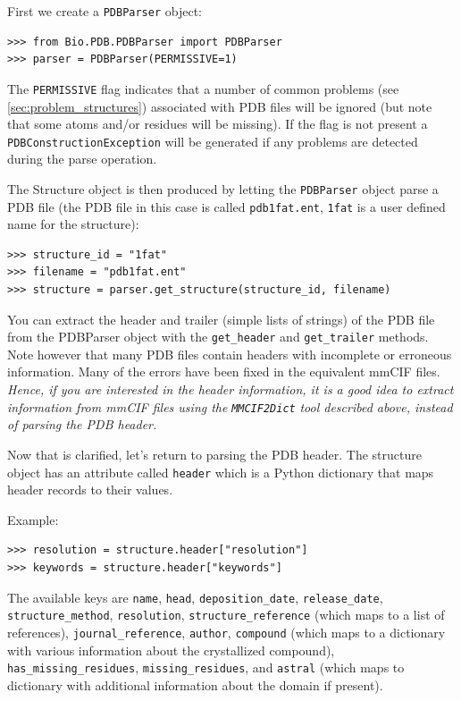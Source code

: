 First we create a \texttt{PDBParser} object:

\begin{verbatim}
>>> from Bio.PDB.PDBParser import PDBParser
>>> parser = PDBParser(PERMISSIVE=1)
\end{verbatim}

The \texttt{PERMISSIVE} flag indicates that a number of common problems (see \ref{sec:problem_structures}) associated with PDB files will be ignored (but note that some atoms and/or residues will be missing). If the flag is not present a \texttt{PDBConstructionException} will be generated if any problems are detected during the parse operation.

The Structure object is then produced by letting the \texttt{PDBParser} object parse a PDB file (the PDB file in this case is called \verb|pdb1fat.ent|, \verb|1fat| is a user defined name for the structure):

\begin{verbatim}
>>> structure_id = "1fat"
>>> filename = "pdb1fat.ent"
>>> structure = parser.get_structure(structure_id, filename)
\end{verbatim}

You can extract the header and trailer (simple lists of strings) of the PDB
file from the PDBParser object with the \texttt{get\_header} and \texttt{get\_trailer}
methods.  Note however that many PDB files contain headers with
incomplete or erroneous information. Many of the errors have been
fixed in the equivalent mmCIF files. \emph{Hence, if you are interested
in the header information, it is a good idea to extract information
from mmCIF files using the} \texttt{\emph{MMCIF2Dict}} \emph{tool
described above, instead of parsing the PDB header. }

Now that is clarified, let's return to parsing the PDB header. The
structure object has an attribute called \texttt{header} which is
a Python dictionary that maps header records to their values.

Example:

\begin{verbatim}
>>> resolution = structure.header["resolution"]
>>> keywords = structure.header["keywords"]
\end{verbatim}
The available keys are \verb+name+, \verb+head+, \verb+deposition_date+, 
\verb+release_date+, \verb+structure_method+, \verb+resolution+, 
\verb+structure_reference+ (which maps to a list of references),
\verb+journal_reference+, \verb+author+, \verb+compound+ (which maps to
a dictionary with various information about the crystallized compound),
\verb+has_missing_residues+, \verb+missing_residues+, and \verb+astral+ 
(which maps to dictionary with additional information about the domain if present).

